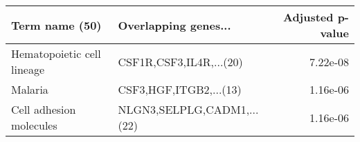 \begin{tabular}{llr}
\toprule
            Term name (50) &       Overlapping genes... &  Adjusted p-value \\
\midrule
Hematopoietic cell lineage &    CSF1R,CSF3,IL4R,...(20) &          7.22e-08 \\
                   Malaria &     CSF3,HGF,ITGB2,...(13) &          1.16e-06 \\
   Cell adhesion molecules & NLGN3,SELPLG,CADM1,...(22) &          1.16e-06 \\
\bottomrule
\end{tabular}
